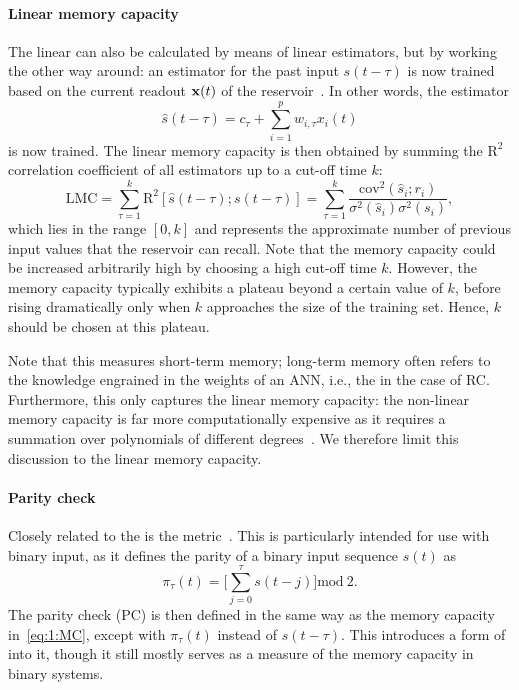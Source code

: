 \paragraph{Linear memory capacity}
The linear  can also be calculated by means of linear estimators, but by working the other way around: an estimator for the past input $s(t - \tau)$ is now trained based on the current readout $\boldsymbol{\mathbf{x}}(t)$ of the reservoir~\cite{tsunegi2019STOforcedsyncRC,NeuromorphicFewShot}.
In other words, the estimator
\begin{equation}
	\hat{s}(t - \tau) = c_\tau + \sum_{i=1}^{p} w_{i,\tau} x_i(t)
\end{equation}
is now trained.
The linear memory capacity is then obtained by summing the $\mathrm{R}^2$ correlation coefficient of all estimators up to a cut-off time $k$:
\begin{equation}
	\label{eq:1:MC}
	\mathrm{LMC} = \sum_{\tau = 1}^{k} \mathrm{R}^2[\hat{s}(t - \tau); s(t - \tau)] = \sum_{\tau = 1}^{k} \frac{\mathrm{cov}^2(\hat{s}_i; r_i)}{\sigma^2(\hat{s}_i) \sigma^2(s_i)} \mathrm{,}
\end{equation}
which lies in the range $[0,k]$ and represents the approximate number of previous input values that the reservoir can recall.
Note that the memory capacity could be increased arbitrarily high by choosing a high cut-off time $k$.
However, the memory capacity typically exhibits a plateau beyond a certain value of $k$, before rising dramatically only when $k$ approaches the size of the training set.
Hence, $k$ should be chosen at this plateau. \par
Note that this measures short-term memory; long-term memory often refers to the knowledge engrained in the weights of an ANN, i.e., the  in the case of RC.
Furthermore, this only captures the linear memory capacity: the non-linear memory capacity is far more computationally expensive as it requires a summation over polynomials of different degrees~\cite{RCbenchmarksReview1}.
We therefore limit this discussion to the linear memory capacity.

\paragraph{Parity check}
Closely related to the  is the  metric~\cite{hon2021numerical,tsunegi2019STOforcedsyncRC}.
This is particularly intended for use with binary input, as it defines the parity of a binary input sequence $s(t)$ as
\begin{equation}
	\pi_\tau(t) = \Bigg[\sum_{j = 0}^{\tau} s(t - j) \Bigg] \mathrm{mod}~2 \mathrm{.}
\end{equation}
The parity check (PC) is then defined in the same way as the memory capacity in~\cref{eq:1:MC}, except with $\pi_\tau(t)$ instead of $s(t - \tau)$.
This introduces a form of  into it, though it still mostly serves as a measure of the memory capacity in binary systems.

